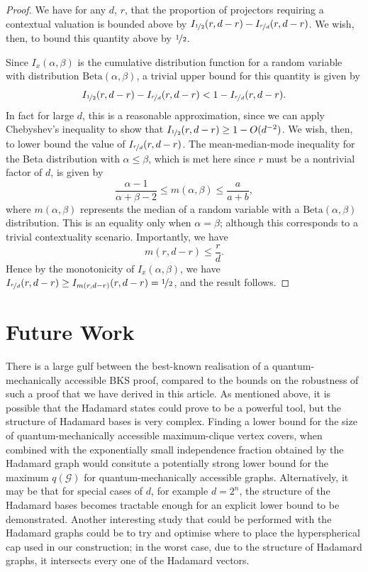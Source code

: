 \documentclass{amsart}
\theoremstyle{definition}
\begin{document}
\begin{proof}
We have for any $d$, $r$, that the proportion of projectors requiring a contextual valuation is bounded above by $I_{\nicefrac{1}{2}}(r,d-r)-I_{\nicefrac{r}{d}}(r,d-r)$. We wish, then, to bound this quantity above by $\nicefrac12$.

Since $I_x(\alpha,\beta)$ is the cumulative distribution function for a random variable with distribution $\mbox{Beta}(\alpha,\beta)$, a trivial upper bound for this quantity is given by
\begin{equation}
I_{\nicefrac{1}{2}}(r,d-r)-I_{\nicefrac{r}{d}}(r,d-r)< 1-I_{\nicefrac{r}{d}}(r,d-r).
\end{equation}
In fact for large $d$, this is a reasonable approximation, since we can apply Chebyshev's inequality to show that $I_{\nicefrac{1}{2}}(r,d-r)\geq1-O(d^{-2})$. We wish, then, to lower bound the value of $I_{\nicefrac{r}{d}}(r,d-r)$. The mean-median-mode inequality \cite{Kerm2011} for the Beta distribution with $\alpha\leq\beta$, which is met here since $r$ must be a nontrivial factor of $d$, is given by
\begin{equation}
\frac{\alpha-1}{\alpha+\beta-2}\leq m(\alpha,\beta)\leq\frac{a}{a+b},
\end{equation}
where $m(\alpha,\beta)$ represents the median of a random variable with a $\mbox{Beta}(\alpha,\beta)$ distribution. This is an equality only when $\alpha=\beta$; although this corresponds to a trivial contextuality scenario. Importantly, we have
\begin{equation}
m(r,d-r)\leq\frac{r}{d}.
\end{equation}
Hence by the monotonicity of $I_x(\alpha,\beta)$, we have $I_{\nicefrac{r}{d}}(r,d-r)\geq I_{m(r,d-r)}(r,d-r)=\nicefrac12$, and the result follows.

\end{proof}


\section{Future Work}
There is a large gulf between the best-known realisation of a quantum-mechanically accessible BKS proof, compared to the bounds on the robustness of such a proof that we have derived in this article. As mentioned above, it is possible that the Hadamard states could prove to be a powerful tool, but the structure of Hadamard bases is very complex. Finding a lower bound for the size of quantum-mechanically accessible maximum-clique vertex covers, when combined with the exponentially small independence fraction obtained by the Hadamard graph would consitute a potentially strong lower bound for the maximum $q(\mathcal{G})$ for quantum-mechanically accessible graphs. Alternatively, it may be that for special cases of $d$, for example $d=2^n$, the structure of the Hadamard bases becomes tractable enough for an explicit lower bound to be demonstrated. Another interesting study that could be performed with the Hadamard graphs could be to try and optimise where to place the hyperspherical cap used in our construction; in the worst case, due to the structure of Hadamard graphs, it intersects every one of the Hadamard vectors. %
\end{document}
